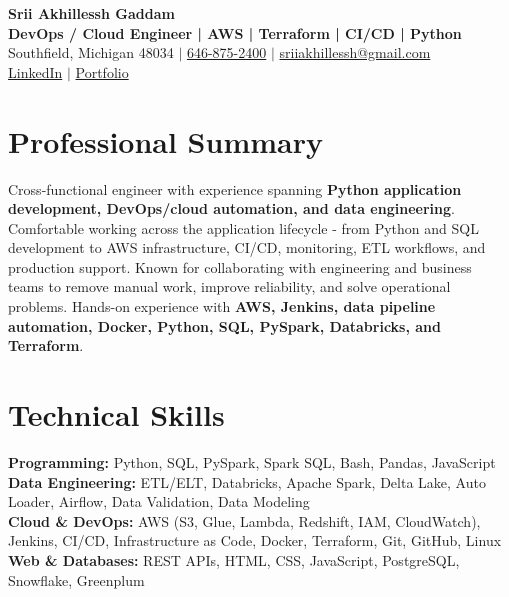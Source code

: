 \documentclass[letterpaper,10pt]{article}
\begin{document}
\fontsize{9.35pt}{10.45pt}\selectfont

\begin{center}
    {\LARGE \textbf{Srii Akhillessh Gaddam}} \\[-1pt]
    \textbf{DevOps / Cloud Engineer | AWS | Terraform | CI/CD | Python} \\[2pt]
    Southfield, Michigan 48034 $|$
    \href{tel:6468752400}{646-875-2400} $|$
    \href{mailto:sriiakhillessh@gmail.com}{sriiakhillessh@gmail.com} \\[1pt]
    \href{https://www.linkedin.com/in/srii-akhiilessh-gaddam-b48668191/}{LinkedIn} $|$
    \href{https://sriiakhillesshg.github.io/portfolio/}{Portfolio}
\end{center}
\vspace{-8pt}

\section{Professional Summary}
\small{Cross-functional engineer with experience spanning \textbf{Python application development, DevOps/cloud automation, and data engineering}. Comfortable working across the application lifecycle - from Python and SQL development to AWS infrastructure, CI/CD, monitoring, ETL workflows, and production support. Known for collaborating with engineering and business teams to remove manual work, improve reliability, and solve operational problems. Hands-on experience with \textbf{AWS, Jenkins, data pipeline automation, Docker, Python, SQL, PySpark, Databricks, and Terraform}.}

\section{Technical Skills}
\small{
\textbf{Programming:} Python, SQL, PySpark, Spark SQL, Bash, Pandas, JavaScript \\
\textbf{Data Engineering:} ETL/ELT, Databricks, Apache Spark, Delta Lake, Auto Loader, Airflow, Data Validation, Data Modeling \\
\textbf{Cloud \& DevOps:} AWS (S3, Glue, Lambda, Redshift, IAM, CloudWatch), Jenkins, CI/CD, Infrastructure as Code, Docker, Terraform, Git, GitHub, Linux \\
\textbf{Web \& Databases:} REST APIs, HTML, CSS, JavaScript, PostgreSQL, Snowflake, Greenplum
}
\end{document}
